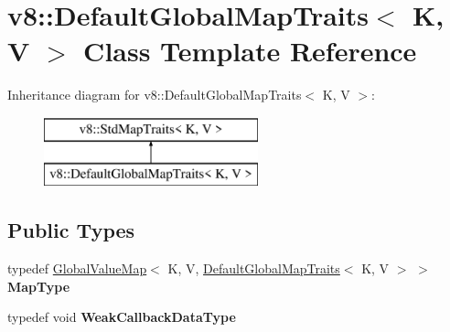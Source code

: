 \hypertarget{classv8_1_1_default_global_map_traits}{}\section{v8\+:\+:Default\+Global\+Map\+Traits$<$ K, V $>$ Class Template Reference}
\label{classv8_1_1_default_global_map_traits}
Inheritance diagram for v8\+:\+:Default\+Global\+Map\+Traits$<$ K, V $>$\+:\begin{figure}[H]
\begin{center}
\leavevmode
\includegraphics[height=2.000000cm]{classv8_1_1_default_global_map_traits}
\end{center}
\end{figure}
\subsection*{Public Types}
\begin{DoxyCompactItemize}
\item 
\hypertarget{classv8_1_1_default_global_map_traits_a6626b089621a436fde5ac1a1132cc83c}{}typedef \hyperlink{classv8_1_1_global_value_map}{Global\+Value\+Map}$<$ K, V, \hyperlink{classv8_1_1_default_global_map_traits}{Default\+Global\+Map\+Traits}$<$ K, V $>$ $>$ {\bfseries Map\+Type}\label{classv8_1_1_default_global_map_traits_a6626b089621a436fde5ac1a1132cc83c}

\item 
\hypertarget{classv8_1_1_default_global_map_traits_af5285197aae83dcb00d0381fbc90869e}{}typedef void {\bfseries Weak\+Callback\+Data\+Type}\label{classv8_1_1_default_global_map_traits_af5285197aae83dcb00d0381fbc90869e}

\end{DoxyCompactItemize}
